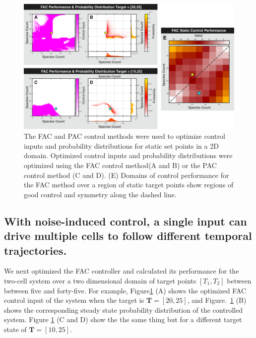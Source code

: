 \documentclass[12pt]{iopart}
\begin{document}
\begin{figure}
\begin{center}
\includegraphics[width=1\textwidth]{StaticControl.pdf}
\vspace{-0.1in}
\caption{The FAC and PAC control methods were used to optimize control inputs and probability distributions for static set points in a 2D domain.  Optimized control inputs and probability distributions were optimized using the FAC control method(A and B) or the PAC control method (C and D). (E) Domains of control performance for the FAC method over a region of static target points show regions of good control and symmetry along the dashed line.} 
\label{CtrlP}
\end{center}
\vspace{-0.2in}
\end{figure}

\subsection{With noise-induced control, a single input can drive multiple cells to follow different temporal trajectories.}

We next optimized the FAC controller and calculated its performance for the two-cell system over a two dimensional domain of target points $[T_1,T_2]$ between between five and forty-five. For example, Figure\ref{CtrlP} (A) shows the optimized FAC control input of the system when the target is $\mathbf{T}=[20,25]$, and Figure.\ \ref{CtrlP} (B) shows the corresponding steady state probability distribution of the controlled system.  Figure \ref{CtrlP} (C and D) show the the same thing but for a different target state of $\mathbf{T}=[10, 25]$.
\end{document}

